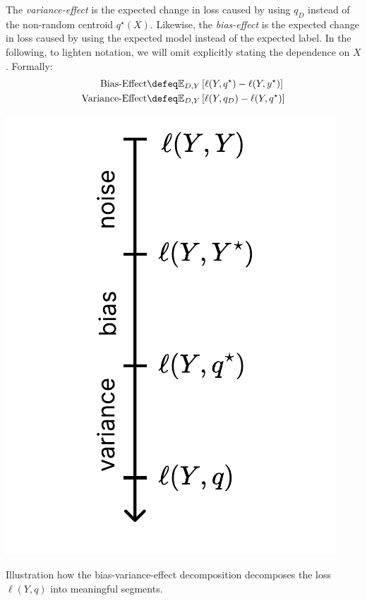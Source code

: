 \documentclass[
	twoside=false, %
]{kaobook}
\begin{document}
The \textit{variance-effect} is the expected change in loss caused by using $q_{D}$ instead of the non-random centroid $q^\star(X)$. Likewise, the \textit{bias-effect} is the expected change in loss caused by using the expected model instead of the expected label. In the following, to lighten notation, we will omit explicitly stating the dependence on $X$.
Formally:
\begin{align*}
\text{Bias-Effect} &\defeq \mathbb{E}_{D,Y}\left[ \ell(Y, q^\star) - \ell(Y, y^\star) \right] \\
\text{Variance-Effect} &\defeq \mathbb{E}_{D,Y}\left[ \ell(Y, q_{D}) - \ell(Y, q^\star) \right] 
\end{align*}


\begin{marginfigure}
  \includegraphics[width=\textwidth]{figma-illustrations/effect-decomp.pdf}
  \caption{
    Illustration how the bias-variance-effect decomposition decomposes the loss $\ell(Y, q)$ into meaningful segments.
  }
  \label{fig:margin-decomp-geometry}
\end{marginfigure}
\end{document}
